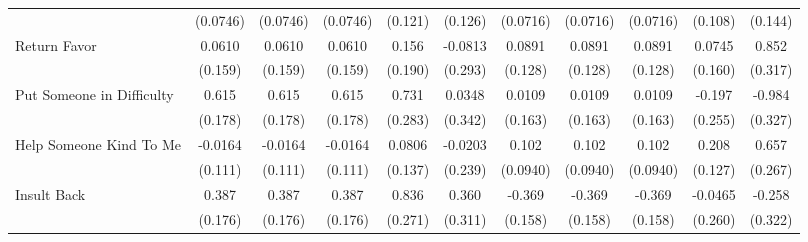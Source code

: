 {\begin{tabular}{l*{10}{c}}
            &    (0.0746)         &    (0.0746)         &    (0.0746)         &     (0.121)         &     (0.126)         &    (0.0716)         &    (0.0716)         &    (0.0716)         &     (0.108)         &     (0.144)         \\
\addlinespace
Return Favor&      0.0610         &      0.0610         &      0.0610         &       0.156         &     -0.0813         &      0.0891         &      0.0891         &      0.0891         &      0.0745         &       0.852\sym{**} \\
            &     (0.159)         &     (0.159)         &     (0.159)         &     (0.190)         &     (0.293)         &     (0.128)         &     (0.128)         &     (0.128)         &     (0.160)         &     (0.317)         \\
\addlinespace
Put Someone in Difficulty&       0.615\sym{***}&       0.615\sym{***}&       0.615\sym{***}&       0.731\sym{**} &      0.0348         &      0.0109         &      0.0109         &      0.0109         &      -0.197         &      -0.984\sym{**} \\
            &     (0.178)         &     (0.178)         &     (0.178)         &     (0.283)         &     (0.342)         &     (0.163)         &     (0.163)         &     (0.163)         &     (0.255)         &     (0.327)         \\
\addlinespace
Help Someone Kind To Me&     -0.0164         &     -0.0164         &     -0.0164         &      0.0806         &     -0.0203         &       0.102         &       0.102         &       0.102         &       0.208         &       0.657\sym{*}  \\
            &     (0.111)         &     (0.111)         &     (0.111)         &     (0.137)         &     (0.239)         &    (0.0940)         &    (0.0940)         &    (0.0940)         &     (0.127)         &     (0.267)         \\
\addlinespace
Insult Back &       0.387\sym{*}  &       0.387\sym{*}  &       0.387\sym{*}  &       0.836\sym{**} &       0.360         &      -0.369\sym{*}  &      -0.369\sym{*}  &      -0.369\sym{*}  &     -0.0465         &      -0.258         \\
            &     (0.176)         &     (0.176)         &     (0.176)         &     (0.271)         &     (0.311)         &     (0.158)         &     (0.158)         &     (0.158)         &     (0.260)         &     (0.322)         \\
\bottomrule
\end{tabular}
}
